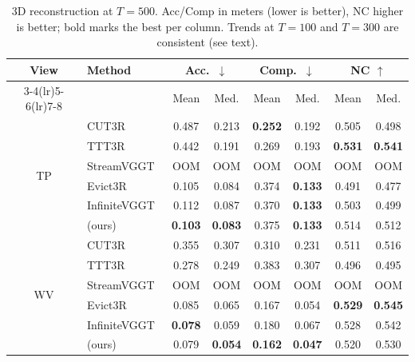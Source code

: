 \begin{table}[t]
    \centering
    \caption{3D reconstruction at $T{=}500$. Acc/Comp in meters (lower is better), NC higher is better; bold marks the best per column. Trends at $T{=}100$ and $T{=}300$ are consistent (see text).}
    \label{tab:recon}
    \tabletext
    \setlength{\tabcolsep}{2.6pt}
    \begin{tabular}{clcccccc}
        \toprule
        \multirow{2}{*}{View} & \multirow{2}{*}{Method}
        & \multicolumn{2}{c}{Acc.\ $\downarrow$}
        & \multicolumn{2}{c}{Comp.\ $\downarrow$}
        & \multicolumn{2}{c}{NC $\uparrow$} \\
        \cmidrule(lr){3-4}\cmidrule(lr){5-6}\cmidrule(lr){7-8}
        & & Mean & Med. & Mean & Med. & Mean & Med. \\
        \midrule
        \multirow{6}{*}{TP}
        & CUT3R~\cite{wang2025cut3r}               & 0.487 & 0.213 & \textbf{0.252} & 0.192 & 0.505 & 0.498 \\
        & TTT3R~\cite{chen2025ttt3r}               & 0.442 & 0.191 & 0.269 & 0.193 & \textbf{0.531} & \textbf{0.541} \\
        & StreamVGGT~\cite{zhuo2025streamvggt}     & OOM & OOM & OOM & OOM & OOM & OOM \\
        & Evict3R~\cite{mahdi2025evict3r}          & 0.105 & 0.084 & 0.374 & \textbf{0.133} & 0.491 & 0.477 \\
        & InfiniteVGGT~\cite{yuan2026infinitevggt} & 0.112 & 0.087 & 0.370 & \textbf{0.133} & 0.503 & 0.499 \\
        & \method{} (ours)                         & \textbf{0.103} & \textbf{0.083} & 0.375 & \textbf{0.133} & 0.514 & 0.512 \\
        \midrule
        \multirow{6}{*}{WV}
        & CUT3R~\cite{wang2025cut3r}               & 0.355 & 0.307 & 0.310 & 0.231 & 0.511 & 0.516 \\
        & TTT3R~\cite{chen2025ttt3r}               & 0.278 & 0.249 & 0.383 & 0.307 & 0.496 & 0.495 \\
        & StreamVGGT~\cite{zhuo2025streamvggt}     & OOM & OOM & OOM & OOM & OOM & OOM \\
        & Evict3R~\cite{mahdi2025evict3r}          & 0.085 & 0.065 & 0.167 & 0.054 & \textbf{0.529} & \textbf{0.545} \\
        & InfiniteVGGT~\cite{yuan2026infinitevggt} & \textbf{0.078} & 0.059 & 0.180 & 0.067 & 0.528 & 0.542 \\
        & \method{} (ours)                         & 0.079 & \textbf{0.054} & \textbf{0.162} & \textbf{0.047} & 0.520 & 0.530 \\
        \bottomrule
    \end{tabular}
\end{table}

